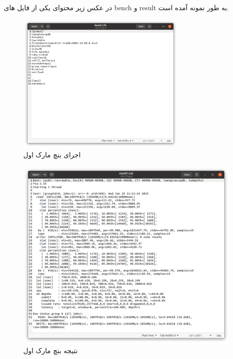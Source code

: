 در عکس زیر محتوای یکی از فایل های bench و result به طور نمونه آمده است.

\begin{figure}[H]
    \centering
    \includegraphics[width=0.75\textwidth]{figs/bfile.png}
    \caption{اجرای بنچ مارک اول}
\end{figure}

\begin{figure}[H]
    \centering
    \includegraphics[width=\textwidth]{figs/rfile.png}
    \caption{نتیجه بنچ مارک اول}
\end{figure}

